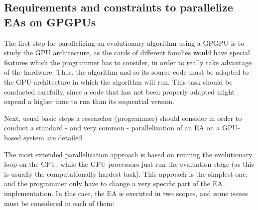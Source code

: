 \documentclass{article}
\begin{document}
\subsection{Requirements and constraints to parallelize EAs on GPGPUs}

The first step for parallelizing an evolutionary algorithm using a GPGPU is to study the GPU architecture, as the cards of different families would have special features which the programmer has to consider, in order to really take advantage of the hardware.
Thus, the algorithm and so its source code must be adapted to the GPU architecture in which the algorithm will run.
This task should be conducted carefully, since a code that has not been properly adapted might expend a higher time to run than its sequential version.

Next, usual basic steps a researcher (programmer) should consider in order to conduct a standard - and very common - parallelization of an EA on a GPU-based system are detailed.

The most extended parallelization approach is based on running the evolutionary loop on the CPU, while the GPU processors just run the evaluation stage (as this is usually the computationally hardest task). This approach is the simplest one, and the programmer only have to change a very specific part of the EA implementation. In this case, the EA is executed in two scopes, and some issues must be considered in each of them:
\end{document}
